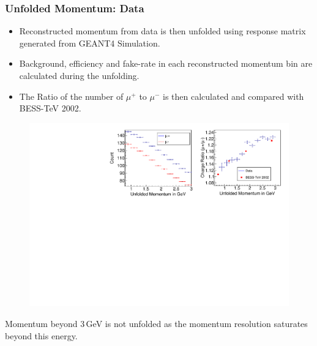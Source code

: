 \documentclass{beamer}
\begin{document}
\begin{frame}
  \frametitle{Unfolded Momentum: Data}
  \vspace*{-9pt}
  \begin{itemize} %
  \item Reconstructed momentum from data is then unfolded using
    response matrix generated from GEANT4 Simulation.
  \item Background, efficiency and fake-rate in each reconstructed
    momentum bin are calculated during the unfolding.
  \item The Ratio of the number of $\mu^{+}$ to $\mu^{-}$ is then
    calculated and compared with BESS-TeV 2002.
  \end{itemize}
  \vspace*{-9pt}
  \begin{figure}[h!]
    \includegraphics[width=0.8\linewidth]{UnfoldedPlot_Grid.pdf}
  \end{figure}
  \vspace*{-9pt}
  Momentum beyond 3\,GeV is not unfolded as the momentum resolution
  saturates beyond this energy.
\end{frame}
\end{document}

